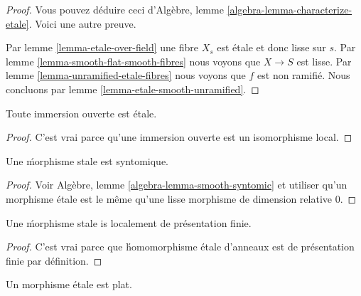 \begin{proof}
Vous pouvez déduire ceci d'Algèbre, lemme \ref{algebra-lemma-characterize-etale}. Voici une autre preuve.

\medskip\noindent
Par lemme \ref{lemma-etale-over-field} une fibre $X_s$ est \'etale et donc lisse sur $s$. Par lemme \ref{lemma-smooth-flat-smooth-fibres} nous voyons que $X \to S$ est lisse. Par lemme \ref{lemma-unramified-etale-fibres} nous voyons que $f$ est non ramifié. Nous concluons par lemme \ref{lemma-etale-smooth-unramified}.
\end{proof}

\begin{lemma}

\label{lemma-open-immersion-etale}
Toute immersion ouverte est \'etale.
\end{lemma}

\begin{proof}

C'est vrai parce qu'une immersion ouverte est un isomorphisme local.

\end{proof}

\begin{lemma}

\label{lemma-etale-syntomic}

Une \'morphisme stale est syntomique.

\end{lemma}

\begin{proof}
Voir Algèbre, lemme \ref{algebra-lemma-smooth-syntomic} et utiliser qu'un morphisme \'etale est le même qu'une lisse morphisme de dimension relative $0$.
\end{proof}

\begin{lemma}

\label{lemma-etale-locally-finite-presentation}

Une \'morphisme stale is localement de présentation finie.

\end{lemma}

\begin{proof}

C'est vrai parce que \'homomorphisme étale d'anneaux est de présentation finie par définition.

\end{proof}

\begin{lemma}

\label{lemma-etale-flat}
Un morphisme \'etale est plat.
\end{lemma}

